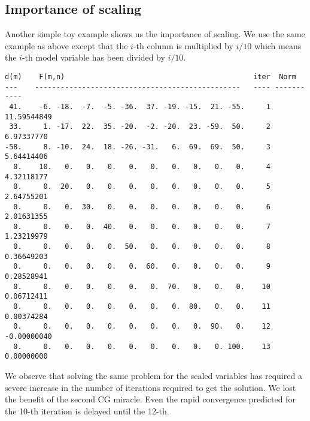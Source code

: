 


\subsection{Importance of scaling}

Another simple toy example shows us the importance of scaling.
We use the same example as above
except that the $i$-th column is multiplied by $i/10$
which means the $i$-th model variable has been divided by $i/10$.

\par\noindent
\footnotesize
\begin{verbatim}
d(m)    F(m,n)                                            iter  Norm
---    ------------------------------------------------   ---- -----------
 41.    -6. -18.  -7.  -5. -36.  37. -19. -15.  21. -55.     1 11.59544849
 33.     1. -17.  22.  35. -20.  -2. -20.  23. -59.  50.     2  6.97337770
-58.     8. -10.  24.  18. -26. -31.   6.  69.  69.  50.     3  5.64414406
  0.    10.   0.   0.   0.   0.   0.   0.   0.   0.   0.     4  4.32118177
  0.     0.  20.   0.   0.   0.   0.   0.   0.   0.   0.     5  2.64755201
  0.     0.   0.  30.   0.   0.   0.   0.   0.   0.   0.     6  2.01631355
  0.     0.   0.   0.  40.   0.   0.   0.   0.   0.   0.     7  1.23219979
  0.     0.   0.   0.   0.  50.   0.   0.   0.   0.   0.     8  0.36649203
  0.     0.   0.   0.   0.   0.  60.   0.   0.   0.   0.     9  0.28528941
  0.     0.   0.   0.   0.   0.   0.  70.   0.   0.   0.    10  0.06712411
  0.     0.   0.   0.   0.   0.   0.   0.  80.   0.   0.    11  0.00374284
  0.     0.   0.   0.   0.   0.   0.   0.   0.  90.   0.    12 -0.00000040
  0.     0.   0.   0.   0.   0.   0.   0.   0.   0. 100.    13  0.00000000
\end{verbatim}
\normalsize
We observe that solving the same problem for the scaled variables
has required a severe increase
in the number of iterations required to get the solution.
We lost the benefit of the second CG miracle.
Even the rapid convergence predicted for the 10-th iteration
is delayed until the 12-th.

